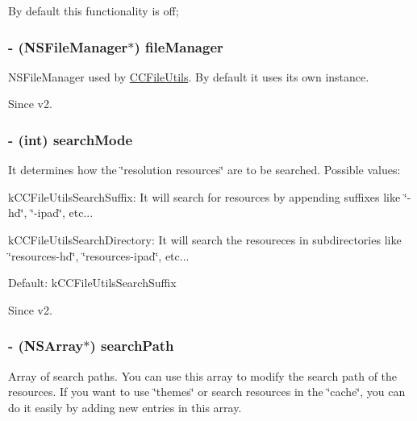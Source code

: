 By default this functionality is off; \hypertarget{class_c_c_file_utils_ac215683dea5e3d946585216861b90115}{
\subsubsection[{file\-Manager}]{\setlength{\rightskip}{0pt plus 5cm}-\/ (N\-S\-File\-Manager$\ast$) {\bf file\-Manager}}}\label{class_c_c_file_utils_ac215683dea5e3d946585216861b90115}
N\-S\-File\-Manager used by \hyperlink{class_c_c_file_utils}{C\-C\-File\-Utils}. By default it uses its own instance. \begin{DoxySince}{Since}
v2. 
\end{DoxySince}
\hypertarget{class_c_c_file_utils_ab6fe1794c328a92c3fc1229df979b8fa}{
\subsubsection[{search\-Mode}]{\setlength{\rightskip}{0pt plus 5cm}-\/ (int) {\bf search\-Mode}}}\label{class_c_c_file_utils_ab6fe1794c328a92c3fc1229df979b8fa}
It determines how the \char`\"{}resolution resources\char`\"{} are to be searched. Possible values\-:
\begin{DoxyItemize}
\item k\-C\-C\-File\-Utils\-Search\-Suffix\-: It will search for resources by appending suffixes like \char`\"{}-\/hd\char`\"{}, \char`\"{}-\/ipad\char`\"{}, etc...
\item k\-C\-C\-File\-Utils\-Search\-Directory\-: It will search the resoureces in subdirectories like \char`\"{}resources-\/hd\char`\"{}, \char`\"{}resources-\/ipad\char`\"{}, etc...
\end{DoxyItemize}

Default\-: k\-C\-C\-File\-Utils\-Search\-Suffix \begin{DoxySince}{Since}
v2. 
\end{DoxySince}
\hypertarget{class_c_c_file_utils_a91d5f3acc62be072bd703120c21ad833}{
\subsubsection[{search\-Path}]{\setlength{\rightskip}{0pt plus 5cm}-\/ (N\-S\-Array$\ast$) {\bf search\-Path}}}\label{class_c_c_file_utils_a91d5f3acc62be072bd703120c21ad833}
Array of search paths. You can use this array to modify the search path of the resources. If you want to use \char`\"{}themes\char`\"{} or search resources in the \char`\"{}cache\char`\"{}, you can do it easily by adding new entries in this array.

